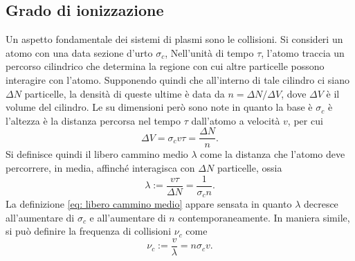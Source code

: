 \subsection{Grado di ionizzazione}
Un aspetto fondamentale dei sistemi di plasmi sono le collisioni. Si consideri un atomo con una data sezione d'urto $\sigma_c$, Nell'unità di tempo $\tau$, l'atomo traccia un percorso cilindrico che determina la regione con cui altre particelle possono interagire con l'atomo. Supponendo quindi che all'interno di tale cilindro ci siano $\Delta N$ particelle, la densità di queste ultime è data da $n = \Delta N/\Delta V$, dove $\Delta V$ è il volume del cilindro. Le su dimensioni però sono note in quanto la base è $\sigma_c$ è l'altezza è la distanza percorsa nel tempo $\tau$ dall'atomo a velocità $v$, per cui
\begin{equation}
    \Delta V = \sigma_c v\tau = \frac{\Delta N}{n}.
\end{equation}
Si definisce quindi il libero cammino medio $\lambda$ come la distanza che l'atomo deve percorrere, in media, affinché interagisca con $\Delta N$ particelle, ossia
\begin{equation}
\label{eq: libero cammino medio}
    \lambda := \frac{v\tau}{\Delta N} = \frac{1}{\sigma_c n}.
\end{equation}
La definizione \eqref{eq: libero cammino medio} appare sensata in quanto $\lambda$ decresce all'aumentare di $\sigma_c$ e all'aumentare di $n$ contemporaneamente. In maniera simile, si può definire la frequenza di collisioni $\nu_c$ come
\begin{equation}
\label{eq: frequenza di collisioni}
    \nu_c := \frac{v}{\lambda} = n\sigma_c v.
\end{equation}

